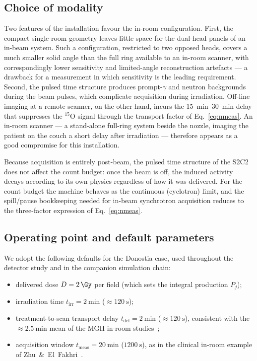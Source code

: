 \documentclass{iopjournal}
\begin{document}
\subsection{Choice of modality}

Two features of the installation favour the in-room configuration. First, the
compact single-room geometry leaves little space for the dual-head panels of an
in-beam system. Such a configuration, restricted to two opposed heads, covers a
much smaller solid angle than the full ring available to an in-room scanner, with
correspondingly lower sensitivity and limited-angle reconstruction artefacts ---
a drawback for a measurement in which sensitivity is the leading requirement.
Second, the pulsed time structure produces prompt-$\gamma$ and neutron
backgrounds during the beam pulses, which complicate acquisition during
irradiation. Off-line imaging at a remote scanner, on the other hand, incurs the
\SIrange{15}{30}{\minute} delay that suppresses the $^{15}$O signal through the
transport factor of Eq.~\eqref{eq:nmeas}. An in-room scanner --- a stand-alone
full-ring system beside the nozzle, imaging the patient on the couch a short
delay after irradiation --- therefore appears as a good compromise for this
installation.

Because acquisition is entirely post-beam, the pulsed time structure of the S2C2
does not affect the count budget: once the beam is off, the induced activity
decays according to its own physics regardless of how it was delivered. For the
count budget the machine behaves as the continuous (cyclotron) limit, and the
spill/pause bookkeeping needed for in-beam synchrotron acquisition reduces to the
three-factor expression of Eq.~\eqref{eq:nmeas}.

\subsection{Operating point and default parameters}

We adopt the following defaults for the Donostia case, used throughout the
detector study and in the companion simulation chain:
\begin{itemize}
  \item delivered dose $D=\SI{2}{\Gy}$ per field (which sets the integral
  production $P_j$);
  \item irradiation time $t_{\mathrm{irr}}=\SI{2}{\minute}$ ($\approx\SI{120}{\second}$);
  \item treatment-to-scan transport delay $t_{\mathrm{del}}=\SI{2}{\minute}$
  ($\approx\SI{120}{\second}$), consistent with the $\approx\SI{2.5}{\minute}$
  mean of the MGH in-room studies~\cite{zhu2011monitoring};
  \item acquisition window $t_{\mathrm{meas}}=\SI{20}{\minute}$
  ($\SI{1200}{\second}$), as in the clinical in-room example of
  Zhu~\&~El~Fakhri~\cite{zhu2013proton}.
\end{itemize}
\end{document}
